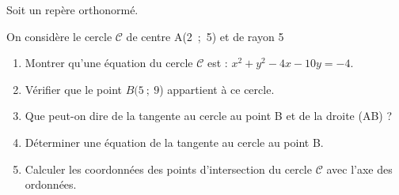 \medskip


Soit \Oij{} un repère orthonormé.

On considère le cercle $\mathcal{C}$ de centre A(2~;~5) et de rayon 5

\medskip

\begin{enumerate}
\item Montrer qu'une équation du cercle $\mathcal{C}$ est : $x^2 + y^2 - 4x - 10y= -4$.
\item Vérifier que le point $B(5~;~9$) appartient à ce cercle.
\item Que peut-on dire de la tangente au cercle au point B et de la droite (AB) ?
\item Déterminer une équation de la tangente au cercle au point B.
\item Calculer les coordonnées des points d'intersection du cercle $\mathcal{C}$ avec l'axe des ordonnées.
\end{enumerate}

\vspace{0,5cm}
